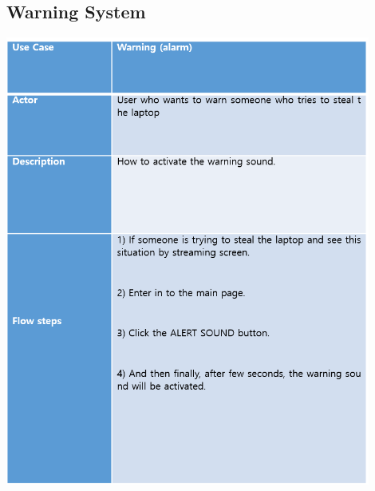 \documentclass[12pt]{article}
\begin{document}
\subsection{Warning System}
\begin{center} 
\includegraphics[width=120mm,scale=1.8]{warningsystem}
\end{center}
\newpage
\end{document}
